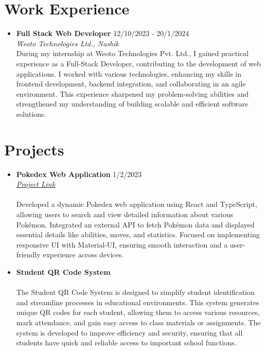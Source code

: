 \documentclass[a4paper,10pt]{article}
\newcommand{\resumeSubheading}[4]{
      \item
        \textbf{#1} \hfill #2 \\
        \textit{#3} \hfill \textit{#4}
    }
\begin{document}
    \section*{\textbf{Work Experience}}
    \begin{itemize}[leftmargin=0.15in, label={}]
        
        \resumeSubheading
            {Full Stack Web Developer}{12/10/2023 - 20/1/2024}
            {Weoto Technologies Ltd., Nashik}{}\\
            {During my internship at Weoto Technologies Pvt. Ltd., I gained practical experience as a Full-Stack Developer, contributing to the development of web applications. I worked with various technologies, enhancing my skills in frontend development, backend integration, and collaborating in an agile environment. This experience sharpened my problem-solving abilities and strengthened my understanding of building scalable and efficient software solutions.}{}
        \vspace{-0.100em}
    \end{itemize}
    \vspace{-0.5em}
  
    \section*{\textbf{Projects}}
    \begin{itemize}[leftmargin=0.15in, label={}]
        
        \resumeSubheading
            {Pokedex Web Application}{1/2/2023}
            {\href{https://www.linkedin.com/feed/ }{Project Link}}{}\\ \\
            {Developed a dynamic Pokedex web application using React and TypeScript, allowing users to search and view detailed information about various Pokémon. Integrated an external API to fetch Pokémon data and displayed essential details like abilities, moves, and statistics. Focused on implementing responsive UI with Material-UI, ensuring smooth interaction and a user-friendly experience across devices.}{}
        \vspace{0.20em}
        \resumeSubheading
            {Student QR Code System}{}
            {\href{}{}}{}\vspace{0.5em} \\
            {The Student QR Code System is designed to simplify student identification and streamline processes in educational environments. This system generates unique QR codes for each student, allowing them to access various resources, mark attendance, and gain easy access to class materials or assignments. The system is developed to improve efficiency and security, ensuring that all students have quick and reliable access to important school functions.}{}
        \vspace{0.20em}
    \end{itemize}
    \vspace{-0.5em}
  
\end{document}
